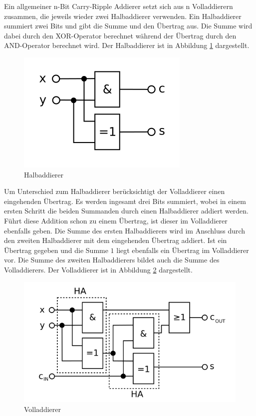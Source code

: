 Ein allgemeiner n-Bit Carry-Ripple Addierer setzt sich aus n Volladdierern zusammen, die jeweils wieder zwei Halbaddierer verwenden. Ein Halbaddierer summiert zwei Bits und
gibt die Summe und den Übertrag aus. Die Summe wird dabei durch den XOR-Operator berechnet während der Übertrag durch den AND-Operator berechnet wird. Der Halbaddierer
ist in Abbildung \ref{fig:halfadder} dargestellt.
\begin{figure}[!h]
  \centering
  \includegraphics[scale=1]{images/halfadder}
  \caption[Halbaddierer]{Halbaddierer\protect\footnotemark}
  \label{fig:halfadder}
\end{figure}

Um Unterschied zum Halbaddierer berücksichtigt der Volladdierer einen eingehenden Übertrag. Es werden ingesamt drei Bits summiert, wobei in einem ersten Schritt
die beiden Summanden durch einen Halbaddierer addiert werden. Führt diese Addition schon zu einem Übertrag, ist dieser im Volladdierer ebenfalls geben.
Die Summe des ersten Halbaddierers wird im Anschluss durch den zweiten Halbaddierer mit dem eingehenden Übertrag addiert. Ist ein Übertrag gegeben und die
Summe $1$ liegt ebenfalls ein Übertrag im Volladdierer vor. Die Summe des zweiten Halbaddierers bildet auch die Summe des Volladdierers. Der Volladdierer
ist in Abbildung \ref{fig:fulladder} dargestellt.  \clearpage
\begin{figure}[!h]
  \centering
  \includegraphics[scale=1]{images/fulladder}
  \caption[Volladdierer]{Volladdierer\protect\footnotemark}
  \label{fig:fulladder}
\end{figure}

